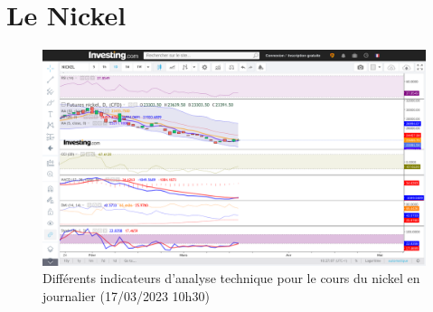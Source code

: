 \documentclass[12pt,a4paper]{article}
\begin{document}
\section{Le Nickel}
\begin{figure}[H]
    \centering
    \includegraphics[width=\textwidth]{image2.png}
    \caption{Différents indicateurs d'analyse technique pour le cours du nickel en journalier (17/03/2023 10h30)}
\end{figure}
\end{document}
